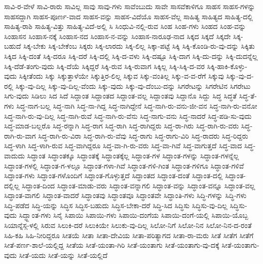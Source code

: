 {ಸಾವಿ-ರ-ವೇಳೆ
ಸಾವಿ-ರಾರು
ಸಾವಿಲ್ಲ
ಸಾವು
ಸಾವು-ಗಳು
ಸಾವೆಂಬುದು
ಸಾವೇ
ಸಾಸವೆಕಾಳಿಗೂ
ಸಾಹಸ
ಸಾಹಸ-ಗಳನ್ನು
ಸಾಹಸದ್ದಾಗಿ
ಸಾಹಸ-ಪೂರ್ಣ-ವಾದ
ಸಾಹಸ-ವನ್ನು
ಸಾಹಸ-ವಿದೆಯೊ
ಸಾಹಸ-ವೆಲ್ಲ
ಸಾಹಿತ್ಯ
ಸಾಹಿತ್ಯದ
ಸಾಹಿತ್ಯ-ದಲ್ಲಿ
ಸಾಹಿತ್ಯ-ರಾಶಿ
ಸಾಹಿತ್ಯ-ವಿತ್ತು
ಸಾಹಿತ್ಯ-ವಿದೆ-ಅಲ್ಲಿ
ಸಿ
ಸಿಂಧುವಿ-ನಲ್ಲಿ-ರುವ
ಸಿಂಹ
ಸಿಂಹ-ಗಳು
ಸಿಂಹದ
ಸಿಂಹ-ವನ್ನು
ಸಿಂಹಾಸನ
ಸಿಂಹಾಸ-ನಕ್ಕೆ
ಸಿಂಹಾಸ-ನದ
ಸಿಂಹಾಸ-ನ-ವನ್ನು
ಸಿಂಹಾಸ-ನಾರೂಢ-ನಾದ
ಸಿಕ್ಕದ
ಸಿಕ್ಕದೆ
ಸಿಕ್ಕದೇ
ಸಿಕ್ಕ-ಬಹುದೆ
ಸಿಕ್ಕ-ಬೇಕು
ಸಿಕ್ಕ-ಬೇಕೆಂಬ
ಸಿಕ್ಕರು
ಸಿಕ್ಕ-ಲಾರದು
ಸಿಕ್ಕ-ಲಿಲ್ಲ
ಸಿಕ್ಕಾ-ಪಟ್ಟೆ
ಸಿಕ್ಕಿ
ಸಿಕ್ಕಿ-ಕೊಂಡಿ-ರು-ವು-ದನ್ನು
ಸಿಕ್ಕಿತು
ಸಿಕ್ಕಿದ
ಸಿಕ್ಕಿ-ದಂತೆ
ಸಿಕ್ಕಿ-ದರೂ
ಸಿಕ್ಕಿ-ದರೆ
ಸಿಕ್ಕಿ-ದಲ್ಲಿ
ಸಿಕ್ಕಿ-ದ-ವಳು
ಸಿಕ್ಕಿ-ದಷ್ಟೂ
ಸಿಕ್ಕಿ-ದಾಗ
ಸಿಕ್ಕಿ-ದು-ದನ್ನು
ಸಿಕ್ಕಿ-ದುದನ್ನೆಲ್ಲ
ಸಿಕ್ಕಿ-ದೆಡೆ-ತಂಗು-ವುದು
ಸಿಕ್ಕಿ-ದೆಯೆ
ಸಿಕ್ಕಿದ್ದರೆ
ಸಿಕ್ಕಿ-ರುವ
ಸಿಕ್ಕಿ-ರುವಾಗ
ಸಿಕ್ಕಿಲ್ಲ
ಸಿಕ್ಕಿ-ಸಿಕ್ಕಿ-ದ-ವರ
ಸಿಕ್ಕಿ-ಹಾಕಿ-ಕೊಳ್ಳು-ವುದು
ಸಿಕ್ಕೀತೆಂದು
ಸಿಕ್ಕು
ಸಿಕ್ಕುತ್ತಾಳೆಯೇ
ಸಿಕ್ಕುತ್ತಿರ-ಲಿಲ್ಲ
ಸಿಕ್ಕುವ
ಸಿಕ್ಕು-ವಂತಿಲ್ಲ
ಸಿಕ್ಕು-ವ-ವ-ರೆಗೆ
ಸಿಕ್ಕುವು
ಸಿಕ್ಕು-ವು-ದ-ರಲ್ಲಿ
ಸಿಕ್ಕು-ವು-ದಿಲ್ಲ
ಸಿಕ್ಕು-ವು-ದಿಲ್ಲ-ವೆಂದು
ಸಿಕ್ಕು-ವುದು
ಸಿಕ್ಕು-ವು-ದೆಂಬು-ದನ್ನು
ಸಿಗರೇಟನ್ನು
ಸಿಗರೇಟಿನ
ಸಿಗರೇಟು
ಸಿಗು-ವುದು
ಸಿಡಿಲು
ಸಿದ
ಸಿದೆ
ಸಿದ್ದಾಂತ
ಸಿದ್ದಾಂತದ
ಸಿದ್ದಾಂತ-ವಲ್ಲ
ಸಿದ್ದಾಂತವು
ಸಿದ್ದಾನೊ
ಸಿದ್ದು
ಸಿದ್ಧ
ಸಿದ್ಧತೆ
ಸಿದ್ಧ-ತೆ-ಗಳು
ಸಿದ್ಧ-ನಾಗ-ಬಲ್ಲ
ಸಿದ್ಧ-ನಾಗಿ
ಸಿದ್ಧ-ನಾ-ಗಿದ್ದ
ಸಿದ್ಧ-ನಾಗಿದ್ದೇನೆ
ಸಿದ್ಧ-ನಾಗಿ-ರು-ವನು-ಜೀ-ವನ
ಸಿದ್ಧ-ನಾಗಿ-ರು-ವನೋ
ಸಿದ್ಧ-ನಾಗಿ-ರು-ವು-ದಿಲ್ಲ
ಸಿದ್ಧ-ನಾಗಿ-ರುವೆ
ಸಿದ್ಧ-ನಾಗಿ-ರು-ವೆನು
ಸಿದ್ಧ-ನಾಗು-ವನು
ಸಿದ್ಧ-ನಾದರೆ
ಸಿದ್ಧ-ಪಡಿ-ಸು-ವುದು
ಸಿದ್ಧ-ಮಾಡ-ಬಲ್ಲರೊ
ಸಿದ್ಧ-ರನ್ನಾಗಿ
ಸಿದ್ಧ-ರಾಗ
ಸಿದ್ಧ-ರಾಗಿ
ಸಿದ್ಧ-ರಾಗಿದ್ದರು
ಸಿದ್ಧ-ರಾ-ಗಿರು
ಸಿದ್ಧ-ರಾಗಿ-ರು-ವರು
ಸಿದ್ಧ-ರಾಗಿ-ರು-ವಾಗ
ಸಿದ್ಧ-ರಾಗಿ-ರು-ವಿರಾ
ಸಿದ್ಧ-ರಾಗಿ-ರು-ವೆವು
ಸಿದ್ಧ-ರಾಗು
ಸಿದ್ಧ-ರಾಗು-ವಿರಿ
ಸಿದ್ಧ-ರಾದರು
ಸಿದ್ಧ-ರಿದ್ದರು
ಸಿದ್ಧ-ಳಾಗಿ
ಸಿದ್ಧ-ಳಾಗಿ-ರುವ
ಸಿದ್ಧ-ವಾಗಿದ್ದರೂ
ಸಿದ್ಧ-ವಾ-ಗಿ-ರು-ವರು
ಸಿದ್ಧ-ವಾ-ಗಿವೆ
ಸಿದ್ಧ-ವಾಗುತ್ತದೆ
ಸಿದ್ಧ-ವಾದ
ಸಿದ್ಧ-ವಾದುದು
ಸಿದ್ಧಾಂತ
ಸಿದ್ಧಾಂತಕ್ಕೂ
ಸಿದ್ಧಾಂತಕ್ಕೆ
ಸಿದ್ಧಾಂತಕ್ಕೆಲ್ಲ
ಸಿದ್ಧಾಂತ-ಗಳ
ಸಿದ್ಧಾಂತ-ಗಳನ್ನು
ಸಿದ್ಧಾಂತ-ಗಳನ್ನೆಲ್ಲ
ಸಿದ್ಧಾಂತ-ಗಳಲ್ಲಿ
ಸಿದ್ಧಾಂತ-ಗ-ಳಲ್ಲೂ
ಸಿದ್ಧಾಂತ-ಗಳಾ-ಗಿವೆ
ಸಿದ್ಧಾಂತ-ಗಳಿ-ಗಿಂತ
ಸಿದ್ಧಾಂತ-ಗಳಿಗೂ
ಸಿದ್ಧಾಂತ-ಗಳಿವೆ
ಸಿದ್ಧಾಂತ-ಗಳು
ಸಿದ್ಧಾಂತ-ಗಳೊಂದಿಗೆ
ಸಿದ್ಧಾಂತ-ಗೊಳ್ಳುತ್ತದೆ
ಸಿದ್ಧಾಂತದ
ಸಿದ್ಧಾಂತ-ದಂತೆ
ಸಿದ್ಧಾಂತ-ದಲ್ಲಿ
ಸಿದ್ಧಾಂತ-ದಲ್ಲಿಲ್ಲ
ಸಿದ್ಧಾಂತ-ದಿಂದ
ಸಿದ್ಧಾಂತ-ಮಾಡು-ವರು
ಸಿದ್ಧಾಂತ-ವನ್ನಾಗಲಿ
ಸಿದ್ಧಾಂತ-ವನ್ನು
ಸಿದ್ಧಾಂತ-ವನ್ನೂ
ಸಿದ್ಧಾಂತ-ವಲ್ಲ
ಸಿದ್ಧಾಂತ-ವಾಗಲಿ
ಸಿದ್ಧಾಂತ-ವಾದರೆ
ಸಿದ್ಧಾಂತವು
ಸಿದ್ಧಾಂತವೂ
ಸಿದ್ಧಾಂತವೇ
ಸಿದ್ಧಾಂತಿ-ಗಳು
ಸಿದ್ಧಿ-ಗಳನ್ನು
ಸಿದ್ಧಿ-ಗಳು
ಸಿದ್ಧಿ-ಪಡೆದ
ಸಿದ್ಧಿ-ಯನ್ನು
ಸಿದ್ಧಿಸ
ಸಿದ್ಧಿಸ-ಬಹುದು
ಸಿದ್ಧಿಸ-ಬೇಕಾ-ದರೆ
ಸಿದ್ಧಿ-ಸಿದ
ಸಿದ್ಧಿಸು
ಸಿದ್ಧಿಸು-ವು-ದಿಲ್ಲ
ಸಿದ್ಧಿಸು-ವುದು
ಸಿದ್ಧ್ದಾಂತ-ಗಳು
ಸಿನೈ
ಸಿಪಾಯಿ
ಸಿಪಾಯಿ-ಗಳು
ಸಿಪಾಯಿ-ದಂಗೆಯ
ಸಿಪಾಯಿ-ದಂಗೆ-ಯಲ್ಲಿ
ಸಿಪಾಯಿ-ಯೊಬ್ಬ
ಸಿಯಾನ್ನೆಸ್ಗ-ಳಲ್ಲಿ
ಸಿರುವ
ಸಿಲುಕಿ-ದರೆ
ಸಿಲುಕಿಯೇ
ಸಿಲುಕು-ವು-ದಿಲ್ಲ
ಸಿಲೋ-ನಿಗೆ
ಸಿಲೋ-ನಿನ
ಸಿಲೋ-ನಿನ-ದ-ರಂತೆ
ಸಿಹಿ-ಕಹಿ
ಸಿಹಿ-ನೀರಿದ್ದರೂ
ಸೀತಯೆ
ಸೀತಾ
ಸೀತಾ-ದೇವಿಯ
ಸೀತಾ-ಪರಿತ್ಯಾಗದ
ಸೀತಾ-ರಾ-ಮರು
ಸೀತೆ
ಸೀತೆಗ
ಸೀತೆಗೆ
ಸೀತೆ-ಪರ್ಣ-ಶಾಲೆ-ಯಲ್ಲಿದ್ದ
ಸೀತೆಯ
ಸೀತೆ-ಯಂತಾ-ಗಿರಿ
ಸೀತೆ-ಯಂತಾಗು
ಸೀತೆ-ಯಂತಾಗು-ವು-ದಕ್ಕೆ
ಸೀತೆ-ಯಂತಾಗು-ವುದು
ಸೀತೆ-ಯದು
ಸೀತೆ-ಯನ್ನು
ಸೀತೆ-ಯಲ್ಲಿದೆ
}
